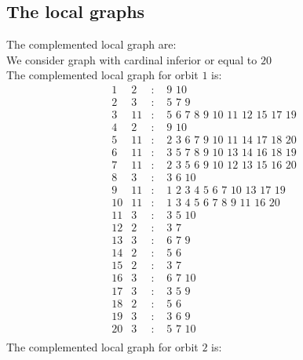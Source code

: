 \documentclass[12pt]{article}
\begin{document}
\subsection{The local graphs}
The complemented local graph are:\\
We consider graph with cardinal inferior or equal to $20$\\
The complemented local graph for orbit $1$ is:
\begin{equation*}
\begin{array}{rrcl}
1&2&:&\,\,9\,\,10\\
2&3&:&\,\,5\,\,7\,\,9\\
3&11&:&\,\,5\,\,6\,\,7\,\,8\,\,9\,\,10\,\,11\,\,12\,\,15\,\,17\,\,19\\
4&2&:&\,\,9\,\,10\\
5&11&:&\,\,2\,\,3\,\,6\,\,7\,\,9\,\,10\,\,11\,\,14\,\,17\,\,18\,\,20\\
6&11&:&\,\,3\,\,5\,\,7\,\,8\,\,9\,\,10\,\,13\,\,14\,\,16\,\,18\,\,19\\
7&11&:&\,\,2\,\,3\,\,5\,\,6\,\,9\,\,10\,\,12\,\,13\,\,15\,\,16\,\,20\\
8&3&:&\,\,3\,\,6\,\,10\\
9&11&:&\,\,1\,\,2\,\,3\,\,4\,\,5\,\,6\,\,7\,\,10\,\,13\,\,17\,\,19\\
10&11&:&\,\,1\,\,3\,\,4\,\,5\,\,6\,\,7\,\,8\,\,9\,\,11\,\,16\,\,20\\
11&3&:&\,\,3\,\,5\,\,10\\
12&2&:&\,\,3\,\,7\\
13&3&:&\,\,6\,\,7\,\,9\\
14&2&:&\,\,5\,\,6\\
15&2&:&\,\,3\,\,7\\
16&3&:&\,\,6\,\,7\,\,10\\
17&3&:&\,\,3\,\,5\,\,9\\
18&2&:&\,\,5\,\,6\\
19&3&:&\,\,3\,\,6\,\,9\\
20&3&:&\,\,5\,\,7\,\,10\\
\end{array}
\end{equation*}
The complemented local graph for orbit $2$ is:
\end{document}
